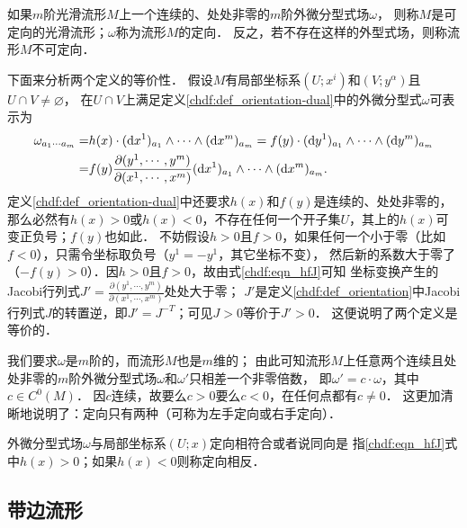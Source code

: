 \begin{definition}\label{chdf:def_orientation-dual}
    如果$m$阶光滑流形$M$上一个连续的、处处非零的$m$阶外微分型式场$\omega$，
    则称$M$是{\heiti 可定向}的光滑流形；$\omega$称为流形$M$的{\heiti 定向}．
    反之，若不存在这样的外型式场，则称流形$M$不可定向．
\end{definition}

下面来分析两个定义的等价性．
假设$M$有局部坐标系$(U;x^i)$和$(V;y^\alpha)$且$U\cap V\neq \varnothing$，
在$U\cap V$上满足定义\ref{chdf:def_orientation-dual}中的外微分型式$\omega$可表示为
\begin{align}
    \omega_{a_1 \cdots a_m}=&h(x)\cdot ({\rm d}x^1)_{a_1} \wedge \cdots \wedge ({\rm d}x^m)_{a_m}
      =f(y) \cdot ({\rm d}y^1)_{a_1} \wedge \cdots \wedge ({\rm d}y^m)_{a_m} \notag \\
      =& f(y)\frac{\partial (y^1,\cdots, y^m)} {\partial (x^1, \cdots, x^m)}
      ({\rm d}x^1)_{a_1} \wedge \cdots \wedge({\rm d}x^m)_{a_m}. \label{chdf:eqn_hfJ}
\end{align}
定义\ref{chdf:def_orientation-dual}中还要求$h(x)$和$f(y)$是连续的、处处非零的，
那么必然有$h(x)>0$或$h(x)<0$，不存在任何一个开子集$U$，其上的$h(x)$可变正负号；$f(y)$也如此．
不妨假设$h>0$且$f>0$，如果任何一个小于零（比如$f<0$），只需令坐标取负号（$y^1=-y^1$，其它坐标不变），
然后新的系数大于零了（$-f(y)>0$）．因$h>0$且$f>0$，故由式\eqref{chdf:eqn_hfJ}可知
坐标变换产生的Jacobi行列式$J'=\frac{\partial (y^1,\cdots, y^m)} {\partial (x^1, \cdots, x^m)}$处处大于零；
$J'$是定义\ref{chdf:def_orientation}中Jacobi行列式$J$的转置逆，即$J'=J^{-T}$；可见$J>0$等价于$J'>0$．
这便说明了两个定义是等价的．


我们要求$\omega$是$m$阶的，而流形$M$也是$m$维的；
由此可知流形$M$上任意两个连续且处处非零的$m$阶外微分型式场$\omega$和$\omega'$只相差一个非零倍数，
即$\omega'=c\cdot \omega$，其中$c\in C^0(M)$．
因$c$连续，故要么$c>0$要么$c<0$，在任何点都有$c\neq 0$．
这更加清晰地说明了：定向只有两种（可称为左手定向或右手定向）．

外微分型式场$\omega$与局部坐标系$(U;x)$定向相符合或者说同向是
指\eqref{chdf:eqn_hfJ}式中$h(x)>0$；如果$h(x)<0$则称定向相反．



\subsection{带边流形}\label{chdf:sec_manifold-boundary}

